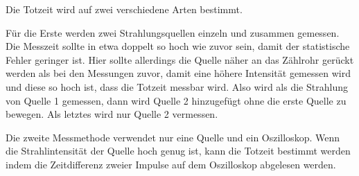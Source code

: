 Die Totzeit wird auf zwei verschiedene Arten bestimmt.

Für die Erste werden zwei Strahlungsquellen einzeln und zusammen gemessen.
Die Messzeit sollte in etwa doppelt so hoch wie zuvor sein, damit der statistische Fehler geringer ist.
Hier sollte allerdings die Quelle näher an das Zählrohr gerückt werden als bei den Messungen zuvor, damit eine höhere Intensität gemessen wird und diese so hoch ist, dass die Totzeit messbar wird.
Also wird als die Strahlung von Quelle 1 gemessen, dann wird Quelle 2 hinzugefügt ohne die erste Quelle zu bewegen.
Als letztes wird nur Quelle 2 vermessen.

Die zweite Messmethode verwendet nur eine Quelle und ein Oszilloskop.
Wenn die Strahlintensität der Quelle hoch genug ist, kann die Totzeit bestimmt werden indem die Zeitdifferenz zweier Impulse auf dem Oszilloskop abgelesen werden.